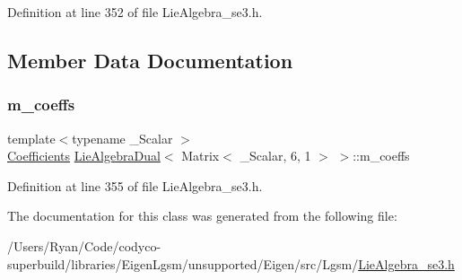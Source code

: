 Definition at line 352 of file Lie\+Algebra\+\_\+se3.\+h.



\subsection{Member Data Documentation}
\hypertarget{class_lie_algebra_dual_3_01_matrix_3_01___scalar_00_016_00_011_01_4_01_4_aa6732bb98b628f1d58e95e50f4596b49}{}\label{class_lie_algebra_dual_3_01_matrix_3_01___scalar_00_016_00_011_01_4_01_4_aa6732bb98b628f1d58e95e50f4596b49} 
\subsubsection{\texorpdfstring{m\+\_\+coeffs}{m\_coeffs}}
{\footnotesize\ttfamily template$<$typename \+\_\+\+Scalar $>$ \\
\hyperlink{class_lie_algebra_dual_3_01_matrix_3_01___scalar_00_016_00_011_01_4_01_4_ae22cd667e4ac77db27cc018db14003bd}{Coefficients} \hyperlink{class_lie_algebra_dual}{Lie\+Algebra\+Dual}$<$ Matrix$<$ \+\_\+\+Scalar, 6, 1 $>$ $>$\+::m\+\_\+coeffs\hspace{0.3cm}{\ttfamily [protected]}}



Definition at line 355 of file Lie\+Algebra\+\_\+se3.\+h.



The documentation for this class was generated from the following file\+:\begin{DoxyCompactItemize}
\item 
/\+Users/\+Ryan/\+Code/codyco-\/superbuild/libraries/\+Eigen\+Lgsm/unsupported/\+Eigen/src/\+Lgsm/\hyperlink{_lie_algebra__se3_8h}{Lie\+Algebra\+\_\+se3.\+h}\end{DoxyCompactItemize}
